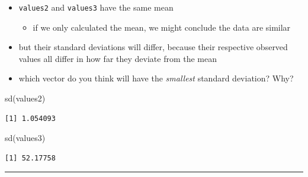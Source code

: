 \documentclass[
  letterpaper,
  DIV=11]{scrartcl}
\newenvironment{Shaded}{\begin{snugshade}}{\end{snugshade}}
\newcommand{\FunctionTok}[1]{\textcolor[rgb]{0.28,0.35,0.67}{#1}}
\newcommand{\NormalTok}[1]{\textcolor[rgb]{0.00,0.23,0.31}{#1}}
\providecommand{\tightlist}{%
  \setlength{\itemsep}{0pt}\setlength{\parskip}{0pt}}\usepackage{longtable,booktabs,array}
\begin{document}
\begin{itemize}
\tightlist
\item
  \texttt{values2} and \texttt{values3} have the same mean

  \begin{itemize}
  \tightlist
  \item
    if we only calculated the mean, we might conclude the data are
    similar
  \end{itemize}
\item
  but their standard deviations will differ, because their respective
  observed values all differ in how far they deviate from the mean
\item
  which vector do you think will have the \emph{smallest} standard
  deviation? Why?
\end{itemize}

\begin{Shaded}
\begin{Highlighting}[]
\FunctionTok{sd}\NormalTok{(values2)}
\end{Highlighting}
\end{Shaded}

\begin{verbatim}
[1] 1.054093
\end{verbatim}

\begin{Shaded}
\begin{Highlighting}[]
\FunctionTok{sd}\NormalTok{(values3)}
\end{Highlighting}
\end{Shaded}

\begin{verbatim}
[1] 52.17758
\end{verbatim}

\begin{center}\rule{0.5\linewidth}{0.5pt}\end{center}
\end{document}
